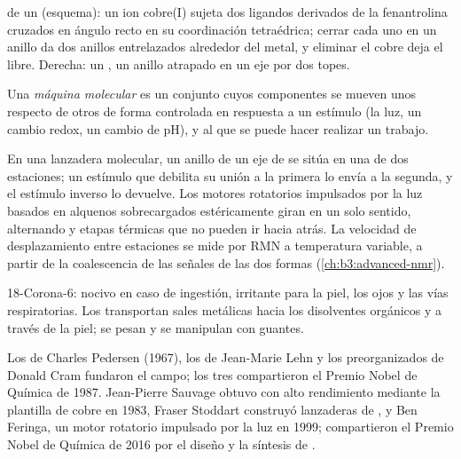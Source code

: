 \begin{omfigure}
{\small {} de un  (esquema): un ion cobre(I) sujeta dos
ligandos derivados de la fenantrolina cruzados en ángulo recto en su coordinación
tetraédrica; cerrar cada uno en un anillo da dos anillos entrelazados alrededor del
metal, y eliminar el cobre deja el  libre. Derecha: un , un
anillo atrapado en un eje por dos topes.}
\end{omfigure}

\begin{definition}\label{def:b3:supramolecular:machine}
Una \emph{máquina molecular} es un conjunto cuyos
componentes se mueven unos respecto de otros de forma controlada en respuesta a un
estímulo (la luz, un cambio redox, un cambio de pH), y al que se puede hacer realizar un trabajo.
\end{definition}

En una lanzadera molecular, un anillo de un eje de  se sitúa en una de dos estaciones; un
estímulo que debilita su unión a la primera lo envía a la segunda, y el
estímulo inverso lo devuelve. Los motores rotatorios impulsados por la luz basados en
alquenos sobrecargados estéricamente giran en un solo sentido, alternando 
y etapas térmicas que no pueden ir hacia atrás. La velocidad de
desplazamiento entre estaciones se mide por RMN a temperatura variable, a partir de la
coalescencia de las señales de las dos formas (\cref{ch:b3:advanced-nmr}).

\begin{safety}{}
18-Corona-6: nocivo en caso de ingestión, irritante para la piel, los ojos y las vías respiratorias.
Los  transportan sales metálicas hacia los disolventes orgánicos y a través de la piel; se
pesan y se manipulan con guantes.
\end{safety}

\begin{history}
Los  de Charles Pedersen (1967), los  de Jean-Marie Lehn y los 
preorganizados de Donald Cram fundaron el campo; los tres compartieron el Premio Nobel
de Química de 1987. Jean-Pierre Sauvage obtuvo  con alto rendimiento mediante la
plantilla de cobre en 1983, Fraser Stoddart construyó lanzaderas de , y Ben
Feringa, un motor rotatorio impulsado por la luz en 1999; compartieron el Premio Nobel de
Química de 2016 por el diseño y la síntesis de .
\end{history}

